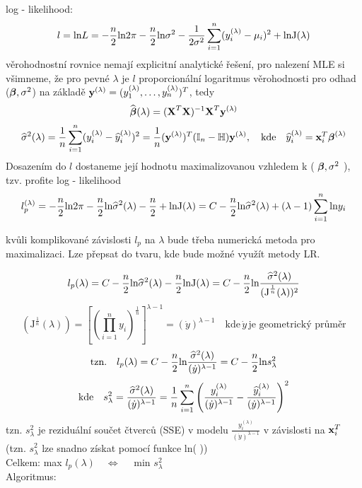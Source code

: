 log - likelihood:
$$
 l = \text{ln}L = -\frac{n}{2}\text{ln} 2 \pi - \frac{n}{2}\text{ln} \sigma^2 - \frac{1}{2 \sigma^2} \sum\limits_{i=1}^{n} ( y_i^{(\lambda)} - \mu_i )^2 + \text{ln}\text{J}(\lambda)
$$
věrohodnostní rovnice nemají explicitní analytické řešení, pro nalezení MLE si všimneme, že pro pevné $ \lambda $ je $ l $ proporcionální logaritmus věrohodnosti pro odhad ($ \boldsymbol{\beta} , \sigma^2 $) na základě $ \textbf{y}^{(\lambda)} = ( y_1^{(\lambda)}, \dots , y_n^{(\lambda)})^T $, tedy
$$
 \widehat{\boldsymbol{\beta}} (\lambda ) = (\textbf{X}^T\textbf{X})^{-1} \textbf{X}^T \textbf{y}^{(\lambda)}
$$
$$
 \widehat{\sigma}^2 (\lambda ) = \frac{1}{n} \sum\limits_{i=1}^{n} ( y_i^{(\lambda)} - \widehat{y} _i^{(\lambda)} )^2 = \frac{1}{n} (\textbf{y}^{(\lambda)})^T ( \mathbb{I} _n - \mathbb{H} ) \textbf{y}^{(\lambda)} , \quad \text{kde} \quad \widehat{y}_i^{(\lambda)} = \textbf{x}_i^T \boldsymbol{\beta}^{(\lambda)}
$$
Dosazením do $ l $ dostaneme její hodnotu maximalizovanou vzhledem k ( $ \boldsymbol{\beta} , \sigma^2 $ ), tzv. profite log - likelihood
$$
  l_p^{(\lambda)} = -\frac{n}{2} \text{ln} 2 \pi - \frac{n}{2} \text{ln} \widehat{\sigma}^2 ( \lambda ) - \frac{n}{2} + \text{ln} \text{J}(\lambda) 
  = C - \frac{n}{2} \text{ln} \widehat{\sigma}^2 ( \lambda ) + ( \lambda - 1 )  \sum\limits_{i=1}^{n} \text{ln} y_i
$$
\begin{remark}
 kvůli komplikované závislosti $ l_p $ na $ \lambda $ bude třeba numerická metoda pro maximalizaci. Lze přepsat do tvaru, kde bude možné využít metody LR.
\end{remark}
$$
 l_p (\lambda) =  C - \frac{n}{2} \text{ln} \widehat{\sigma}^2 ( \lambda )  - \frac{n}{2} \text{ln}\text{J}(\lambda) = C - \frac{n}{2} \text{ln} \frac{ \widehat{\sigma}^2 ( \lambda )}{(\text{J}^{\frac{1}{n}}(\lambda))^2} 
$$
$$
 (\text{J}^{\frac{1}{n}}(\lambda)) = \left[ \left( \prod_{i=1}^{n} y_i \right)^{\frac{1}{n}} \right]^{\lambda - 1} = ( \dot{y} )^{\lambda - 1} \quad \text{kde} \, \dot{y} \, \text{je geometrický průměr}
$$
$$
\text{tzn.} \quad  l_p(\lambda) = C - \frac{n}{2} \text{ln} \frac{ \widehat{\sigma}^2 ( \lambda )}{(\dot{y})^{\lambda - 1}} = C - \frac{n}{2}\text{ln} s_{\lambda}^{2} 
$$
$$
\text{kde} \quad s_{\lambda}^{2} = \frac{ \widehat{\sigma}^2 ( \lambda )}{(\dot{y})^{\lambda - 1}} = \frac{1}{n} \sum\limits_{i=1}^{n} \left( \frac{y_i^{(\lambda)}}{( \dot{y})^{\lambda-1}} - \frac{\widehat{y}_i^{(\lambda)}}{( \dot{y})^{\lambda-1}} \right)^2
$$
tzn. $ s_{\lambda}^{2} $ je reziduální součet čtverců (SSE) v modelu $ \frac{y_i^{(\lambda)}}{( \dot{y})^{\lambda-1}} $ v závislosti na $ \textbf{x}_i^T $ (tzn. $ s_{\lambda}^{2} $ lze snadno získat pomocí funkce ln( )) \\
Celkem: max $ l_p(\lambda) \quad \Leftrightarrow \quad $ min $ s_{\lambda}^{2} $ \\
Algoritmus: \\
